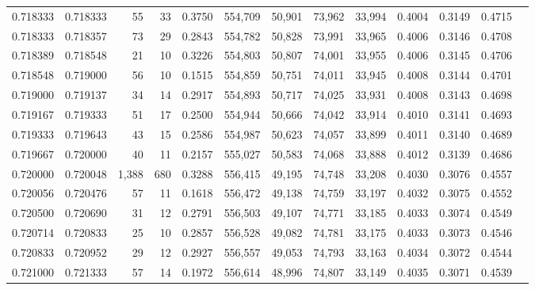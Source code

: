 \begin{tabular}{rrrrrrrrrrrrr}
0.718333 & 0.718333 &    55 &  33 &                                     0.3750 & 554,709 &  50,901 &  73,962 &  33,994 & 0.4004 & 0.3149 & 0.4715 \\
0.718333 & 0.718357 &    73 &  29 &                                     0.2843 & 554,782 &  50,828 &  73,991 &  33,965 & 0.4006 & 0.3146 & 0.4708 \\
0.718389 & 0.718548 &    21 &  10 &                                     0.3226 & 554,803 &  50,807 &  74,001 &  33,955 & 0.4006 & 0.3145 & 0.4706 \\
0.718548 & 0.719000 &    56 &  10 &                                     0.1515 & 554,859 &  50,751 &  74,011 &  33,945 & 0.4008 & 0.3144 & 0.4701 \\
0.719000 & 0.719137 &    34 &  14 &                                     0.2917 & 554,893 &  50,717 &  74,025 &  33,931 & 0.4008 & 0.3143 & 0.4698 \\
0.719167 & 0.719333 &    51 &  17 &                                     0.2500 & 554,944 &  50,666 &  74,042 &  33,914 & 0.4010 & 0.3141 & 0.4693 \\
0.719333 & 0.719643 &    43 &  15 &                                     0.2586 & 554,987 &  50,623 &  74,057 &  33,899 & 0.4011 & 0.3140 & 0.4689 \\
0.719667 & 0.720000 &    40 &  11 &                                     0.2157 & 555,027 &  50,583 &  74,068 &  33,888 & 0.4012 & 0.3139 & 0.4686 \\
0.720000 & 0.720048 & 1,388 & 680 &                                     0.3288 & 556,415 &  49,195 &  74,748 &  33,208 & 0.4030 & 0.3076 & 0.4557 \\
0.720056 & 0.720476 &    57 &  11 &                                     0.1618 & 556,472 &  49,138 &  74,759 &  33,197 & 0.4032 & 0.3075 & 0.4552 \\
0.720500 & 0.720690 &    31 &  12 &                                     0.2791 & 556,503 &  49,107 &  74,771 &  33,185 & 0.4033 & 0.3074 & 0.4549 \\
0.720714 & 0.720833 &    25 &  10 &                                     0.2857 & 556,528 &  49,082 &  74,781 &  33,175 & 0.4033 & 0.3073 & 0.4546 \\
0.720833 & 0.720952 &    29 &  12 &                                     0.2927 & 556,557 &  49,053 &  74,793 &  33,163 & 0.4034 & 0.3072 & 0.4544 \\
0.721000 & 0.721333 &    57 &  14 &                                     0.1972 & 556,614 &  48,996 &  74,807 &  33,149 & 0.4035 & 0.3071 & 0.4539 \\

\end{tabular}

